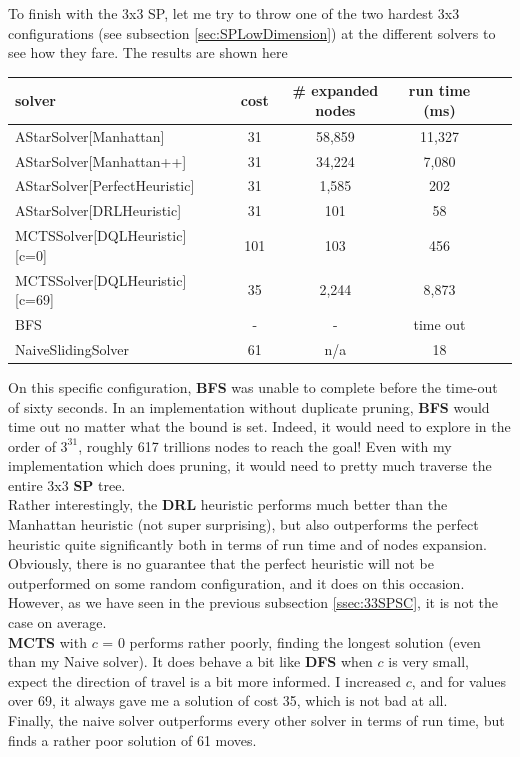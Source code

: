 \label{ssec:33SPHard}
To finish with the 3x3 SP, let me try to throw one of the two hardest 3x3 configurations (see subsection \ref{sec:SPLowDimension}) at the different solvers to see how they fare. The results are shown here

\begin{center}
\begin{tabular}{l*{5}{c}r}
\hline
\textbf{solver}      & & \textbf{cost} & \textbf{\# expanded nodes} & \textbf{run time (ms)} \\
\hline
AStarSolver[Manhattan]   &   &      31  & 58,859  & 11,327  \\
\hline
AStarSolver[Manhattan++]   &   &      31  & 34,224  & 7,080  \\
\hline
AStarSolver[PerfectHeuristic]  &   & 31 & 1,585 & 202 \\
\hline
AStarSolver[DRLHeuristic]  &   & 31 & 101 & 58 \\
\hline
MCTSSolver[DQLHeuristic][c=0]  &   & 101 & 103 & 456 \\
\hline
MCTSSolver[DQLHeuristic][c=69]  &   & 35 & 2,244 & 8,873 \\
\hline
BFS  &   & - & - & time out \\
\hline
NaiveSlidingSolver  &   & 61 & n/a & 18 \\
\hline
\end{tabular}
\end{center}
On this specific configuration, \textbf{BFS} was unable to complete before the time-out of sixty seconds. In an implementation without duplicate pruning, \textbf{BFS} would time out no matter what the bound is set. Indeed, it would need to explore in the order of $3^{31}$, roughly 617 trillions nodes to reach the goal! Even with my implementation which does pruning, it would need to pretty much traverse the entire 3x3 \textbf{SP} tree.
\\
Rather interestingly, the \textbf{DRL} heuristic performs much better than the Manhattan heuristic (not super surprising), but also outperforms the perfect heuristic quite significantly both in terms of run time and of nodes expansion. Obviously, there is no guarantee that the perfect heuristic will not be outperformed on some random configuration, and it does on this occasion. However, as we have seen in the previous subsection \ref{ssec:33SPSC}, it is not the case on average.
\\
\textbf{MCTS} with $c$ = 0 performs rather poorly, finding the longest solution (even than my Naive solver). It does behave a bit like \textbf{DFS} when $c$ is very small, expect the direction of travel is a bit more informed. I increased $c$, and for values over 69, it always gave me a solution of cost 35, which is not bad at all.
\\
Finally, the naive solver outperforms every other solver in terms of run time, but finds a rather poor solution of 61 moves.




